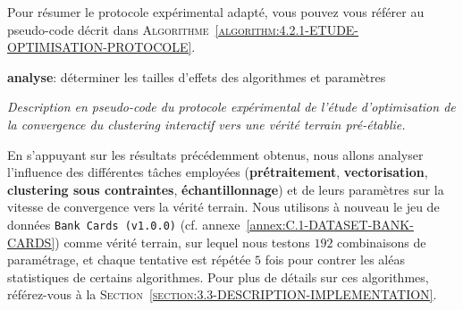 			Pour résumer le protocole expérimental adapté, vous pouvez vous référer au pseudo-code décrit dans \textsc{Algorithme~\ref{algorithm:4.2.1-ETUDE-OPTIMISATION-PROTOCOLE}}.
			
			\begin{algorithm}
				\textbf{analyse}: déterminer les tailles d'effets des algorithmes et paramètres \;
				\caption{\textit{
					Description en pseudo-code du protocole expérimental de l'étude d'optimisation de la convergence du \textit{clustering} interactif vers une vérité terrain pré-établie.
				}}
				\label{algorithm:4.2.1-ETUDE-OPTIMISATION-PROTOCOLE}
			\end{algorithm}
			
			En s'appuyant sur les résultats précédemment obtenus,
			nous allons analyser l'influence des différentes tâches employées (\textbf{prétraitement}, \textbf{vectorisation}, \textbf{clustering sous contraintes}, \textbf{échantillonnage}) et de leurs paramètres sur la vitesse de convergence vers la vérité terrain.
			Nous utilisons à nouveau le jeu de données \texttt{Bank Cards (v1.0.0)} (cf. annexe~\ref{annex:C.1-DATASET-BANK-CARDS}) comme vérité terrain, sur lequel nous testons $192$ combinaisons de paramétrage, et chaque tentative est répétée $5$ fois pour contrer les aléas statistiques de certains algorithmes.
			Pour plus de détails sur ces algorithmes, référez-vous à la \textsc{Section~\ref{section:3.3-DESCRIPTION-IMPLEMENTATION}}.
			

